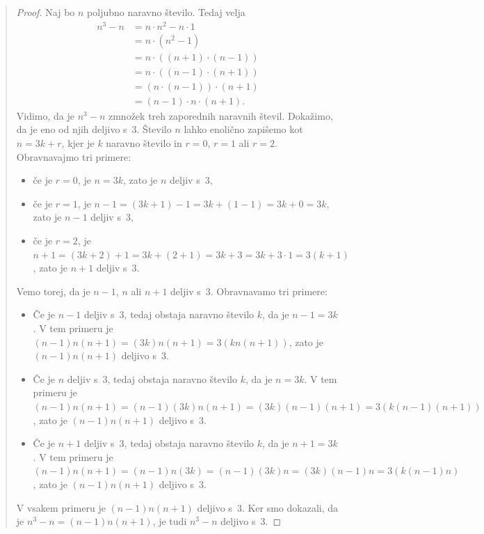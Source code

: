 \begin{quote}
  \begin{proof}
    Naj bo $n$ poljubno naravno število. Tedaj velja
    \begin{align*}
      n^3 - n
      &= n \cdot n^2 - n \cdot 1 \\
      &= n \cdot (n^2 - 1) \\
      &= n \cdot ((n + 1) \cdot (n - 1)) \\
      &= n \cdot ((n - 1) \cdot (n + 1)) \\
      &= (n \cdot (n - 1)) \cdot (n + 1) \\
      &= (n - 1) \cdot n \cdot (n + 1).
    \end{align*}
    Vidimo, da je $n^3 - n$ zmnožek treh zaporednih naravnih števil.
    Dokažimo, da je eno od njih deljivo s~$3$. Število $n$ lahko
    enolično zapišemo kot $n = 3 k + r$, kjer je $k$ naravno število
    in $r = 0$, $r = 1$ ali $r = 2$. Obravnavajmo tri primere:
    \begin{itemize}
    \item če je $r = 0$, je $n = 3 k$, zato je $n$ deljiv s~$3$,
    \item če je $r = 1$, je $n - 1 = (3 k + 1) - 1 = 3 k + (1 - 1) = 3
      k + 0 = 3 k$, zato je $n-1$ deljiv s~$3$,
    \item če je $r = 2$, je $n + 1 = (3 k + 2) + 1 = 3 k + (2 + 1) = 3
      k + 3 = 3 k + 3 \cdot 1 = 3 (k +1)$, zato je $n+1$ deljiv s~$3$.
    \end{itemize}
    Vemo torej, da je $n - 1$, $n$ ali $n + 1$ deljiv s~$3$.
    Obravnavamo tri primere:
    \begin{itemize}
    \item Če je $n - 1$ deljiv s~$3$, tedaj  obstaja naravno število
      $k$, da je $n - 1 = 3 k$. V tem primeru je $(n - 1) n (n + 1) =
      (3 k) n (n + 1) = 3 (k n (n + 1))$, zato je $(n - 1) n (n + 1)$
      deljivo s~$3$.
    \item Če je $n$ deljiv s~$3$, tedaj obstaja naravno število $k$,
      da je $n = 3 k$. V tem primeru je $(n - 1) n (n + 1) = (n - 1)
      (3 k) n (n + 1) = (3 k) (n - 1) (n + 1) = 3 (k (n - 1) (n +
      1))$, zato je $(n - 1) n (n + 1)$ deljivo s~$3$.
    \item Če je $n + 1$ deljiv s~$3$, tedaj obstaja naravno število
      $k$, da je $n + 1 = 3 k$. V tem primeru je $(n - 1) n (n + 1) =
      (n - 1) n (3 k) = (n - 1) (3 k) n = (3 k) (n - 1) n = 3 (k (n -
      1) n)$, zato je $(n - 1) n (n + 1)$ deljivo s~$3$.
    \end{itemize}
    V vsakem primeru je $(n - 1) n (n + 1)$ deljivo s~$3$. Ker smo
    dokazali, da je $n^3 - n = (n - 1) n (n + 1)$, je tudi $n^3 - n$
    deljivo s~$3$.
  \end{proof}
\end{quote}

